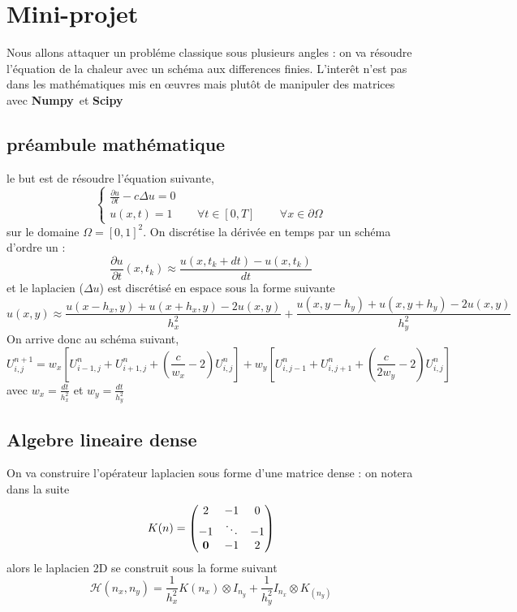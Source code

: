 \documentclass[11pt,a4wide]{article}
\newcommand{\numpy}{{\bf Numpy}\ }
\newcommand{\scipy}{{\bf Scipy}\ }
\begin{document}
\begin{itemize}
\begin{itemize}
    \end{itemize}

\section{Mini-projet}

   Nous allons attaquer un probléme classique sous plusieurs angles : on va résoudre l'équation de la chaleur avec
   un schéma aux differences finies. L'interêt n'est pas dans les mathématiques mis en \oe uvres mais plutôt
   de manipuler des matrices avec \numpy et \scipy

   \subsection{préambule mathématique}
    
   le but est de résoudre l'équation suivante, 
$$
\begin{cases} 
\frac{\partial u}{\partial t} - c \Delta u = 0 \\
u(x,t) = 1 \, \qquad \forall  t \in [0,T] \qquad \,  \forall x \in \partial \Omega
\end{cases}
$$
sur le domaine $\Omega = [0,1]^2$.
On discrétise la dérivée en temps par un schéma d'ordre un :
$$
\frac{\partial u}{\partial t}(x,t_k) \approx \frac{u(x, t_k + dt) - u(x, t_k)}{dt}
$$
et le laplacien ($\Delta u$) est discrétisé en espace sous la forme suivante 
$$
u(x,y) \approx \frac{u(x-h_x, y) + u(x+ h_x, y) - 2 u(x,y)}{h_x^2} +  \frac{u(x, y-h_y) + u(x, y + h_y) - 2 u(x,y)}{h_y^2} 
$$
On arrive donc au schéma suivant, 
\begin{equation}\label{Chal}
U^{n+1}_{i,j} =  w_x \left[U^n_{i-1, j} + U^n_{i+1, j} + \left(\frac{c}{w_x}-2\right) U^n_{i,j} \right] 
             + w_y \left[U^n_{i,j-1} + U^n_{i, j+1} + \left(\frac{c}{2w_y}-2\right)U^n_{i,j} \right]
\end{equation}
avec $w_x = \frac{dt}{h_x^2}$ et $w_y = \frac{dt}{h_y^2}$

 \end{itemize}
 
   \subsection{Algebre lineaire dense}

    On va construire l'opérateur laplacien sous forme d'une matrice dense : on notera dans la suite
$$
K(n) = \begin{pmatrix}
       2       & -1      & 0 \\
       -1      &  \ddots & -1 \\
       {\bf 0} & -1      & 2 \\
       \end{pmatrix}
$$
alors le laplacien 2D se construit sous la forme suivant
$$
{\mathcal H}(n_x,n_y) = \frac{1}{h_x^2} K(n_x) \otimes I_{n_y} + \frac{1}{h_y^2} I_{n_x} \otimes  K_(n_y) 
$$
\end{document}
